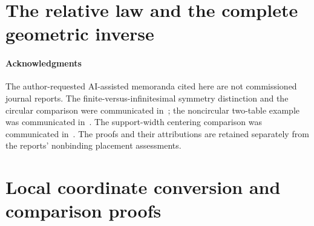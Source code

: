 \part{The relative law and the complete geometric inverse}





























\subsection*{Acknowledgments}
The author-requested AI-assisted memoranda cited here are not commissioned
journal reports. The finite-versus-infinitesimal symmetry distinction and
the circular comparison were communicated in~\cite{A2ReviewV48}; the
noncircular two-table example was communicated in~\cite{A2ReviewV49}.
The support-width centering comparison was communicated
in~\cite{A2ReviewV51}. The proofs and their attributions are retained
separately from the reports' nonbinding placement assessments.

\appendix
\renewcommand{\thesection}{A.\arabic{section}}
\renewcommand{\theHsection}{principal.appendix.\arabic{section}}
\part{Local coordinate conversion and comparison proofs}






